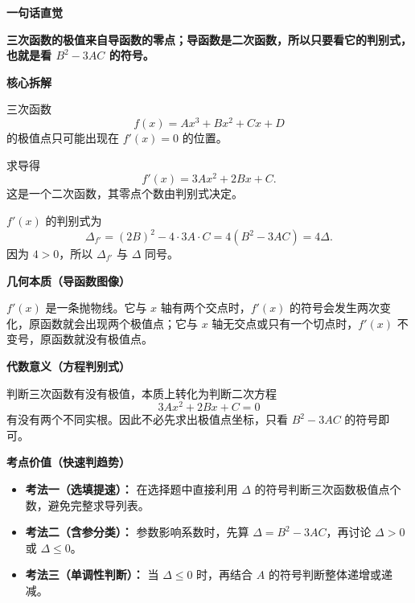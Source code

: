 \begin{explanationbox}
	\textbf{\textcolor{CExplanation}{一句话直觉}}

	\textbf{三次函数的极值来自导函数的零点；导函数是二次函数，所以只要看它的判别式，也就是看 $B^2-3AC$ 的符号。}

	\medskip
	\textbf{\textcolor{CExplanation}{核心拆解}}
	\begin{description}[style=nextline, leftmargin=2.8em, labelsep=0.5em, itemsep=0.45em]
		\item[\textbf{要点一（极值点来源）：}]
		      三次函数
		      \[
			      f(x)=Ax^3+Bx^2+Cx+D
		      \]
		      的极值点只可能出现在 $f'(x)=0$ 的位置。

		\item[\textbf{要点二（导函数结构）：}]
		      求导得
		      \[
			      f'(x)=3Ax^2+2Bx+C.
		      \]
		      这是一个二次函数，其零点个数由判别式决定。

		\item[\textbf{要点三（判别式角色）：}]
		      $f'(x)$ 的判别式为
		      \[
			      \Delta_{f'}=(2B)^2-4\cdot3A\cdot C=4(B^2-3AC)=4\Delta.
		      \]
		      因为 $4>0$，所以 $\Delta_{f'}$ 与 $\Delta$ 同号。
	\end{description}

	\medskip
	\textbf{\textcolor{CExplanation}{几何本质（导函数图像）}}

	$f'(x)$ 是一条抛物线。它与 $x$ 轴有两个交点时，$f'(x)$ 的符号会发生两次变化，原函数就会出现两个极值点；它与 $x$ 轴无交点或只有一个切点时，$f'(x)$ 不变号，原函数就没有极值点。

	\medskip
	\textbf{\textcolor{CExplanation}{代数意义（方程判别式）}}

	判断三次函数有没有极值，本质上转化为判断二次方程
	\[
		3Ax^2+2Bx+C=0
	\]
	有没有两个不同实根。因此不必先求出极值点坐标，只看 $B^2-3AC$ 的符号即可。

	\medskip
	\textbf{\textcolor{CExplanation}{考点价值（快速判趋势）}}
	\begin{itemize}[leftmargin=*, itemsep=0.5em, topsep=0.4em]
		\item \textbf{考法一（选填提速）：} 在选择题中直接利用 $\Delta$ 的符号判断三次函数极值点个数，避免完整求导列表。
		\item \textbf{考法二（含参分类）：} 参数影响系数时，先算 $\Delta=B^2-3AC$，再讨论 $\Delta>0$ 或 $\Delta\le0$。
		\item \textbf{考法三（单调性判断）：} 当 $\Delta\le0$ 时，再结合 $A$ 的符号判断整体递增或递减。
	\end{itemize}


\end{explanationbox}
